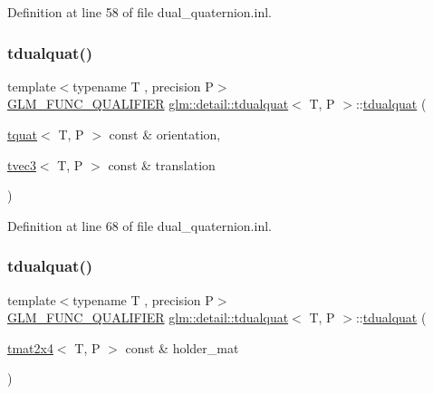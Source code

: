 Definition at line 58 of file dual\+\_\+quaternion.\+inl.

\mbox{\label{structglm_1_1detail_1_1tdualquat_abf6379e6f03b8fd76ae490434893286a}} 
\subsubsection{\texorpdfstring{tdualquat()}{tdualquat()}\hspace{0.1cm}{\footnotesize\ttfamily [4/6]}}
{\footnotesize\ttfamily template$<$typename T , precision P$>$ \\
\hyperlink{setup_8hpp_a33fdea6f91c5f834105f7415e2a64407}{G\+L\+M\+\_\+\+F\+U\+N\+C\+\_\+\+Q\+U\+A\+L\+I\+F\+I\+ER} \hyperlink{structglm_1_1detail_1_1tdualquat}{glm\+::detail\+::tdualquat}$<$ T, P $>$\+::\hyperlink{structglm_1_1detail_1_1tdualquat}{tdualquat} (\begin{DoxyParamCaption}\item[{\hyperlink{structglm_1_1detail_1_1tquat}{tquat}$<$ T, P $>$ const \&}]{orientation,  }\item[{\hyperlink{structglm_1_1detail_1_1tvec3}{tvec3}$<$ T, P $>$ const \&}]{translation }\end{DoxyParamCaption})}



Definition at line 68 of file dual\+\_\+quaternion.\+inl.

\mbox{\label{structglm_1_1detail_1_1tdualquat_a07db5c65293e34b2d0e53c62940db0f8}} 
\subsubsection{\texorpdfstring{tdualquat()}{tdualquat()}\hspace{0.1cm}{\footnotesize\ttfamily [5/6]}}
{\footnotesize\ttfamily template$<$typename T , precision P$>$ \\
\hyperlink{setup_8hpp_a33fdea6f91c5f834105f7415e2a64407}{G\+L\+M\+\_\+\+F\+U\+N\+C\+\_\+\+Q\+U\+A\+L\+I\+F\+I\+ER} \hyperlink{structglm_1_1detail_1_1tdualquat}{glm\+::detail\+::tdualquat}$<$ T, P $>$\+::\hyperlink{structglm_1_1detail_1_1tdualquat}{tdualquat} (\begin{DoxyParamCaption}\item[{\hyperlink{structglm_1_1detail_1_1tmat2x4}{tmat2x4}$<$ T, P $>$ const \&}]{holder\+\_\+mat }\end{DoxyParamCaption})\hspace{0.3cm}{\ttfamily [explicit]}}



